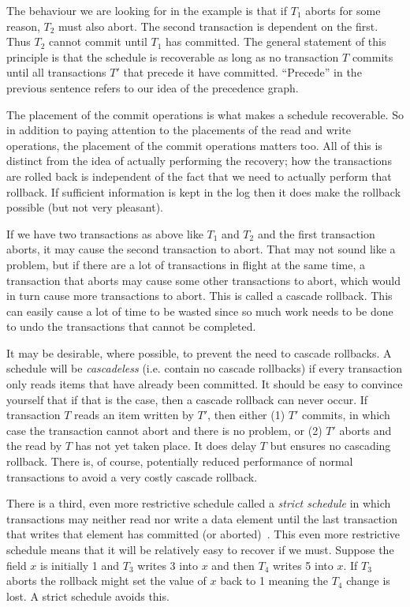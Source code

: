 \documentclass[a4paper]{report}
\begin{document}
The behaviour we are looking for in the example is that if $T_{1}$ aborts for some reason, $T_{2}$ must also abort. The second transaction is dependent on the first. Thus  $T_{2}$ cannot commit until $T_{1}$ has committed. The general statement of this principle is that the schedule is recoverable as long as no transaction $T$ commits until all transactions $T'$ that precede it have committed. ``Precede'' in the previous sentence refers to our idea of the precedence graph.

The placement of the commit operations is what makes a schedule recoverable. So in addition to paying attention to the placements of the read and write operations, the placement of the commit operations matters too. All of this is distinct from the idea of actually performing the recovery; how the transactions are rolled back is independent of the fact that we need to actually perform that rollback. If sufficient information is kept in the log then it does make the rollback possible (but not very pleasant).

If we have two transactions as above like $T_{1}$ and $T_{2}$ and the first transaction aborts, it may cause the second transaction to abort. That may not sound like a problem, but if there are a lot of transactions in flight at the same time, a transaction that aborts may cause some other transactions to abort, which would in turn cause more transactions to abort. This is called a cascade rollback. This can easily cause a lot of time to be wasted since so much work needs to be done to undo the transactions that cannot be completed.

It may be desirable, where possible, to prevent the need to cascade rollbacks. A schedule will be \textit{cascadeless} (i.e. contain no cascade rollbacks) if every transaction only reads items that have already been committed. It should be easy to convince yourself that if that is the case, then a cascade rollback can never occur. If transaction $T$ reads an item written by $T'$, then either (1) $T'$ commits, in which case the transaction cannot abort and there is no problem, or (2) $T'$ aborts and the read by $T$ has not yet taken place. It does delay $T$ but ensures no cascading rollback. There is, of course, potentially reduced performance of normal transactions to avoid a very costly cascade rollback. 

There is a third, even more restrictive schedule called a \textit{strict schedule} in which transactions may neither read nor write a data element until the last transaction that writes that element has committed (or aborted)~\cite{fds}. This even more restrictive schedule means that it will be relatively easy to recover if we must. Suppose the field $x$ is initially 1 and $T_{3}$ writes 3 into $x$ and then $T_{4}$ writes 5 into $x$. If $T_{3}$ aborts the rollback might set the value of $x$ back to 1 meaning the $T_{4}$ change is lost. A strict schedule avoids this.
\end{document}
